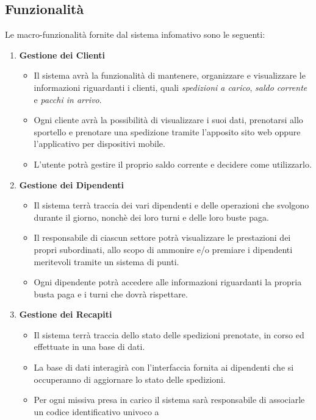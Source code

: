 \documentclass[a4paper,12pt]{article}
\begin{document}
\subsection{Funzionalità}
Le macro-funzionalità fornite dal sistema infomativo sono le seguenti:
\begin{enumerate}
  \item \textbf{Gestione dei Clienti} \begin{itemize}
      \item Il sistema avrà la funzionalità di mantenere, organizzare e visualizzare le informazioni riguardanti i clienti, 
        quali \textit{spedizioni a carico}, \textit{saldo corrente} e \textit{pacchi in arrivo}.
      \item Ogni cliente avrà la possibilità di visualizzare i suoi dati, prenotarsi allo sportello e prenotare una spedizione 
        tramite l'apposito sito web oppure l'applicativo per dispositivi mobile.
      \item L'utente potrà gestire il proprio saldo corrente e decidere come utilizzarlo.
    \end{itemize}
  \item \textbf{Gestione dei Dipendenti} \begin{itemize}
      \item Il sistema terrà traccia dei vari dipendenti e delle operazioni che svolgono durante il giorno, nonchè dei loro 
        turni e delle loro buste paga.
      \item Il responsabile di ciascun settore potrà visualizzare le prestazioni dei propri subordinati, allo scopo di 
        ammonire e/o premiare i dipendenti meritevoli tramite un sistema di punti.
      \item Ogni dipendente potrà accedere alle informazioni riguardanti la propria busta paga e i turni che dovrà rispettare.
    \end{itemize}
  \item \textbf{Gestione dei Recapiti} \begin{itemize}
      \item Il sistema terrà traccia dello stato delle spedizioni prenotate, in corso ed effettuate in una base di dati.
      \item La base di dati interagirà con l'interfaccia fornita ai dipendenti che si occuperanno di aggiornare lo stato 
        delle spedizioni.
      \item Per ogni missiva presa in carico il sistema sarà responsabile di associarle un codice identificativo univoco a 

\end{itemize}
\end{enumerate}
\end{document}

